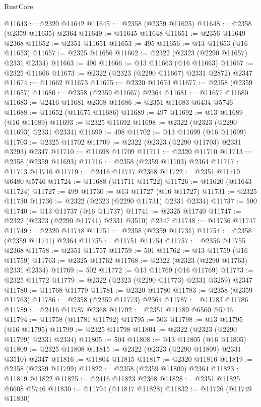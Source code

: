 \begin{lexlean}{RustCore}
\begin{coremodule}
@11643 := @2320 @11642
@11645 := @2358 (@2359 @11625)
@11648 := @2358 (@2359 @11635) @2364
@11649 := @11645 @11648
@11651 := @2356 @11649 @2368
@11652 := @2351 @11651
@11653 := 495
@11656 := @13 @11653 (@16 @11653)
@11657 := @2325 @11656
@11662 := @2322 (@2323 (@2290 @11657) @2331 @2334)
@11663 := 496
@11666 := @13 @11663 (@16 @11663)
@11667 := @2325 @11666
@11673 := @2322 (@2323 (@2290 @11667) @2331 @2872) @2347
@11674 := @11662 @11673
@11675 := @2320 @11674
@11677 := @2358 (@2359 @11657)
@11680 := @2358 (@2359 @11667) @2364
@11681 := @11677 @11680
@11683 := @2416 @11681 @2368
@11686 := @2351 @11683 @6434 @5746
@11688 := @11652 (@11675 @11686)
@11689 := 497
@11692 := @13 @11689 (@16 @11689)
@11693 := @2325 @11692
@11698 := @2322 (@2323 (@2290 @11693) @2331 @2334)
@11699 := 498
@11702 := @13 @11699 (@16 @11699)
@11703 := @2325 @11702
@11709 := @2322 (@2323 (@2290 @11703) @2331 @3293) @2347
@11710 := @11698 @11709
@11711 := @2320 @11710
@11713 := @2358 (@2359 @11693)
@11716 := @2358 (@2359 @11703) @2364
@11717 := @11713 @11716
@11719 := @2416 @11717 @2368
@11722 := @2351 @11719 @6480 @5746
@11724 := @11688 (@11711 @11722)
@11726 := @11620 (@11643 @11724)
@11727 := 499
@11730 := @13 @11727 (@16 @11727)
@11731 := @2325 @11730
@11736 := @2322 (@2323 (@2290 @11731) @2331 @2334)
@11737 := 500
@11740 := @13 @11737 (@16 @11737)
@11741 := @2325 @11740
@11747 := @2322 (@2323 (@2290 @11741) @2331 @3510) @2347
@11748 := @11736 @11747
@11749 := @2320 @11748
@11751 := @2358 (@2359 @11731)
@11754 := @2358 (@2359 @11741) @2364
@11755 := @11751 @11754
@11757 := @2356 @11755 @2368
@11758 := @2351 @11757
@11759 := 501
@11762 := @13 @11759 (@16 @11759)
@11763 := @2325 @11762
@11768 := @2322 (@2323 (@2290 @11763) @2331 @2334)
@11769 := 502
@11772 := @13 @11769 (@16 @11769)
@11773 := @2325 @11772
@11779 := @2322 (@2323 (@2290 @11773) @2331 @3259) @2347
@11780 := @11768 @11779
@11781 := @2320 @11780
@11783 := @2358 (@2359 @11763)
@11786 := @2358 (@2359 @11773) @2364
@11787 := @11783 @11786
@11789 := @2416 @11787 @2368
@11792 := @2351 @11789 @6560 @5746
@11794 := @11758 (@11781 @11792)
@11795 := 503
@11798 := @13 @11795 (@16 @11795)
@11799 := @2325 @11798
@11804 := @2322 (@2323 (@2290 @11799) @2331 @2334)
@11805 := 504
@11808 := @13 @11805 (@16 @11805)
@11809 := @2325 @11808
@11815 := @2322 (@2323 (@2290 @11809) @2331 @3510) @2347
@11816 := @11804 @11815
@11817 := @2320 @11816
@11819 := @2358 (@2359 @11799)
@11822 := @2358 (@2359 @11809) @2364
@11823 := @11819 @11822
@11825 := @2416 @11823 @2368
@11828 := @2351 @11825 @6608 @5746
@11830 := @11794 (@11817 @11828)
@11832 := @11726 (@11749 @11830)

\end{coremodule}
\end{lexlean}
